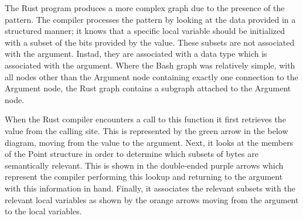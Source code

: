 The Rust program produces a more complex graph due to the presence of the pattern.
The compiler processes the pattern by looking at the data provided in a structured manner;
it knows that a specific local variable should be initialized with a subset of the bits
provided by the value.
These subsets are not associated with the argument.
Instad, they are associated with a data type which is associated with the argument.
Where the Bash graph was relatively simple, with all nodes other than the Argument node
containing exactly one connection to the Argument node, the Rust graph contains a subgraph
attached to the Argument node.


When the Rust compiler encounters a call to this function it first retrieves the value
from the calling site.
This is represented by the green arrow in the below diagram, moving from the value to the
argument.
Next, it looks at the members of the Point structure in order to determine which subsets
of bytes are semantically relevant.
This is shown in the double-ended purple arrows which represent the compiler performing
this lookup and returning to the argument with this information in hand.
Finally, it associates the relevant subsets with the relevant local variables as shown
by the orange arrows moving from the argument to the local variables.

